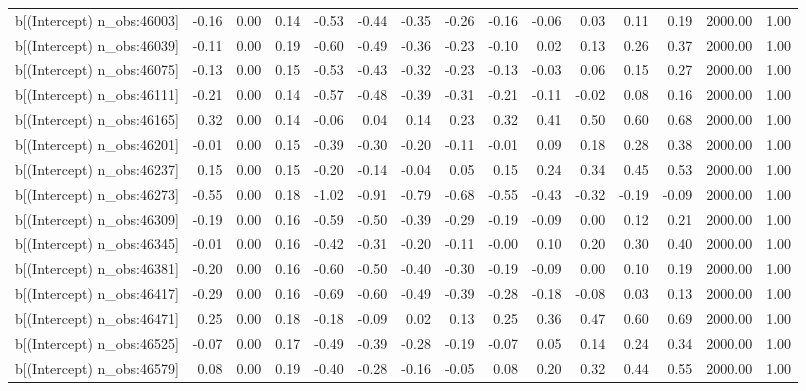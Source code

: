 \begin{table}[ht]
\begin{tabular}{rrrrrrrrrrrrrrr}
  b[(Intercept) n\_obs:46003] & -0.16 & 0.00 & 0.14 & -0.53 & -0.44 & -0.35 & -0.26 & -0.16 & -0.06 & 0.03 & 0.11 & 0.19 & 2000.00 & 1.00 \\ 
  b[(Intercept) n\_obs:46039] & -0.11 & 0.00 & 0.19 & -0.60 & -0.49 & -0.36 & -0.23 & -0.10 & 0.02 & 0.13 & 0.26 & 0.37 & 2000.00 & 1.00 \\ 
  b[(Intercept) n\_obs:46075] & -0.13 & 0.00 & 0.15 & -0.53 & -0.43 & -0.32 & -0.23 & -0.13 & -0.03 & 0.06 & 0.15 & 0.27 & 2000.00 & 1.00 \\ 
  b[(Intercept) n\_obs:46111] & -0.21 & 0.00 & 0.14 & -0.57 & -0.48 & -0.39 & -0.31 & -0.21 & -0.11 & -0.02 & 0.08 & 0.16 & 2000.00 & 1.00 \\ 
  b[(Intercept) n\_obs:46165] & 0.32 & 0.00 & 0.14 & -0.06 & 0.04 & 0.14 & 0.23 & 0.32 & 0.41 & 0.50 & 0.60 & 0.68 & 2000.00 & 1.00 \\ 
  b[(Intercept) n\_obs:46201] & -0.01 & 0.00 & 0.15 & -0.39 & -0.30 & -0.20 & -0.11 & -0.01 & 0.09 & 0.18 & 0.28 & 0.38 & 2000.00 & 1.00 \\ 
  b[(Intercept) n\_obs:46237] & 0.15 & 0.00 & 0.15 & -0.20 & -0.14 & -0.04 & 0.05 & 0.15 & 0.24 & 0.34 & 0.45 & 0.53 & 2000.00 & 1.00 \\ 
  b[(Intercept) n\_obs:46273] & -0.55 & 0.00 & 0.18 & -1.02 & -0.91 & -0.79 & -0.68 & -0.55 & -0.43 & -0.32 & -0.19 & -0.09 & 2000.00 & 1.00 \\ 
  b[(Intercept) n\_obs:46309] & -0.19 & 0.00 & 0.16 & -0.59 & -0.50 & -0.39 & -0.29 & -0.19 & -0.09 & 0.00 & 0.12 & 0.21 & 2000.00 & 1.00 \\ 
  b[(Intercept) n\_obs:46345] & -0.01 & 0.00 & 0.16 & -0.42 & -0.31 & -0.20 & -0.11 & -0.00 & 0.10 & 0.20 & 0.30 & 0.40 & 2000.00 & 1.00 \\ 
  b[(Intercept) n\_obs:46381] & -0.20 & 0.00 & 0.16 & -0.60 & -0.50 & -0.40 & -0.30 & -0.19 & -0.09 & 0.00 & 0.10 & 0.19 & 2000.00 & 1.00 \\ 
  b[(Intercept) n\_obs:46417] & -0.29 & 0.00 & 0.16 & -0.69 & -0.60 & -0.49 & -0.39 & -0.28 & -0.18 & -0.08 & 0.03 & 0.13 & 2000.00 & 1.00 \\ 
  b[(Intercept) n\_obs:46471] & 0.25 & 0.00 & 0.18 & -0.18 & -0.09 & 0.02 & 0.13 & 0.25 & 0.36 & 0.47 & 0.60 & 0.69 & 2000.00 & 1.00 \\ 
  b[(Intercept) n\_obs:46525] & -0.07 & 0.00 & 0.17 & -0.49 & -0.39 & -0.28 & -0.19 & -0.07 & 0.05 & 0.14 & 0.24 & 0.34 & 2000.00 & 1.00 \\ 
  b[(Intercept) n\_obs:46579] & 0.08 & 0.00 & 0.19 & -0.40 & -0.28 & -0.16 & -0.05 & 0.08 & 0.20 & 0.32 & 0.44 & 0.55 & 2000.00 & 1.00 \\ 

\end{tabular}
\end{table}
